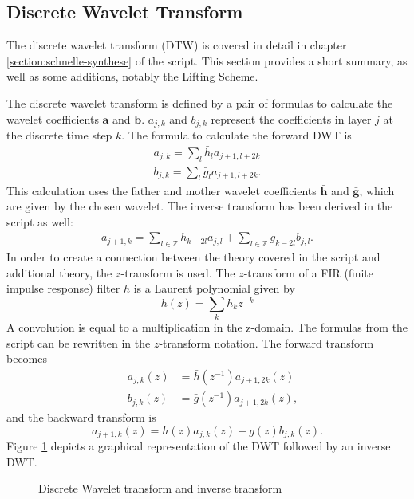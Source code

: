 \begin{refsection}
\section{Discrete Wavelet Transform}

The discrete wavelet transform (DTW) is covered in detail in chapter \ref{section:schnelle-synthese} of the script.
This section provides a short summary, as well as some additions, notably the Lifting Scheme.

The discrete wavelet transform is defined by a pair of formulas to calculate the wavelet coefficients $\bm a$ and $\bm b$.
$a_{j,k}$ and $b_{j,k}$ represent the coefficients in layer $j$ at the discrete time step $k$.
The formula to calculate the forward DWT is
\begin{align}
a_{j,k} = \sum_{l} \bar{h}_l a_{j+1,l+2k}
\\
b_{j,k} = \sum_{l} \bar{g}_l a_{j+1,l+2k} .
\end{align}
This calculation uses the father and mother wavelet coefficients $\bm{\bar h}$ and $\bm{\bar g}$, which are given by the chosen wavelet.
The inverse transform has been derived in the script as well: 
\begin{align}
a_{j+1,k} =
\sum_{l\in\mathbb Z}
h_{k-2l}
a_{j,l}
+
\sum_{l\in\mathbb Z}
g_{k-2l}
b_{j,l} .
\end{align}
In order to create a connection between the theory covered in the script and additional theory, the $z$-transform is used.
The $z$-transform of a FIR (finite impulse response) filter $h$ is a Laurent polynomial given by
\begin{equation}
h(z) = \sum_{k} h_k z^{-k}
\end{equation}
A convolution is equal to a multiplication in the z-domain.
The formulas from the script can be rewritten in the $z$-transform notation.
The forward transform becomes
\begin{align}
\quad a_{j,k}(z) &= \bar h(z^{-1}) a_{j+1,2k}(z) 
\\
\quad b_{j,k}(z) &= \bar g(z^{-1}) a_{j+1,2k}(z),
\end{align}
and the backward transform is
\begin{equation}
a_{j+1,k}(z) = h(z) a_{j,k}(z) + g(z) b_{j,k}(z).
\end{equation}
Figure \ref{fpga:fig:dwt} depicts a graphical representation of the DWT followed by an inverse DWT.
\begin{figure}
	\centering
	
	\caption{Discrete Wavelet transform and inverse transform}
	\label{fpga:fig:dwt}
\end{figure}


\end{refsection}
